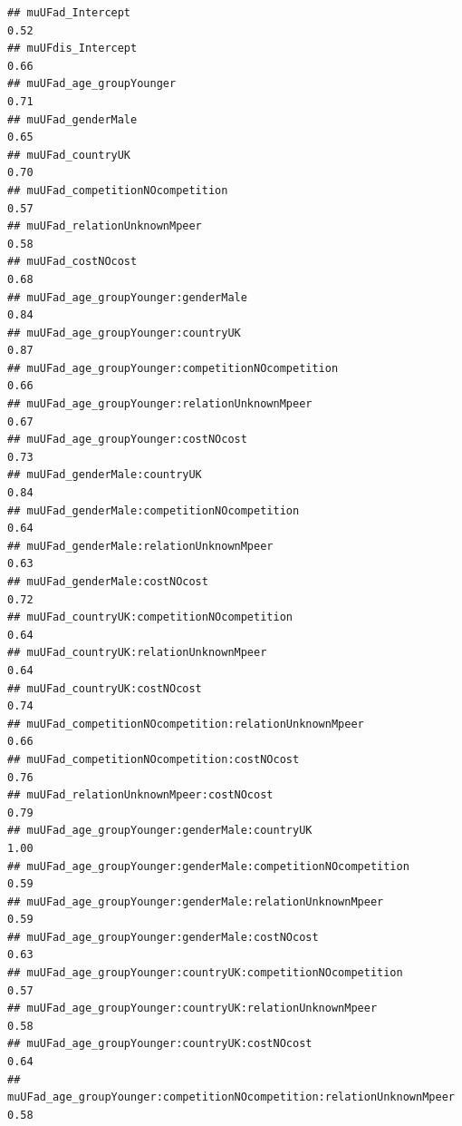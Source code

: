 \documentclass[
]{article}
\begin{document}
\begin{verbatim}
## muUFad_Intercept                                                            0.52
## muUFdis_Intercept                                                           0.66
## muUFad_age_groupYounger                                                     0.71
## muUFad_genderMale                                                           0.65
## muUFad_countryUK                                                            0.70
## muUFad_competitionNOcompetition                                             0.57
## muUFad_relationUnknownMpeer                                                 0.58
## muUFad_costNOcost                                                           0.68
## muUFad_age_groupYounger:genderMale                                          0.84
## muUFad_age_groupYounger:countryUK                                           0.87
## muUFad_age_groupYounger:competitionNOcompetition                            0.66
## muUFad_age_groupYounger:relationUnknownMpeer                                0.67
## muUFad_age_groupYounger:costNOcost                                          0.73
## muUFad_genderMale:countryUK                                                 0.84
## muUFad_genderMale:competitionNOcompetition                                  0.64
## muUFad_genderMale:relationUnknownMpeer                                      0.63
## muUFad_genderMale:costNOcost                                                0.72
## muUFad_countryUK:competitionNOcompetition                                   0.64
## muUFad_countryUK:relationUnknownMpeer                                       0.64
## muUFad_countryUK:costNOcost                                                 0.74
## muUFad_competitionNOcompetition:relationUnknownMpeer                        0.66
## muUFad_competitionNOcompetition:costNOcost                                  0.76
## muUFad_relationUnknownMpeer:costNOcost                                      0.79
## muUFad_age_groupYounger:genderMale:countryUK                                1.00
## muUFad_age_groupYounger:genderMale:competitionNOcompetition                 0.59
## muUFad_age_groupYounger:genderMale:relationUnknownMpeer                     0.59
## muUFad_age_groupYounger:genderMale:costNOcost                               0.63
## muUFad_age_groupYounger:countryUK:competitionNOcompetition                  0.57
## muUFad_age_groupYounger:countryUK:relationUnknownMpeer                      0.58
## muUFad_age_groupYounger:countryUK:costNOcost                                0.64
## muUFad_age_groupYounger:competitionNOcompetition:relationUnknownMpeer       0.58

\end{verbatim}
\end{document}
